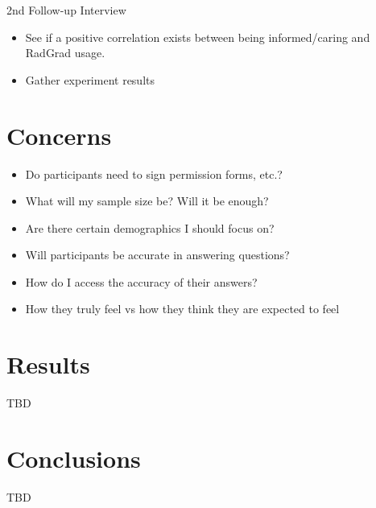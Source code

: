 \documentclass[english]{proposalnsf}
\begin{document}
  2nd Follow-up Interview
  \begin{itemize}
    \item See if a positive correlation exists between being informed/caring and RadGrad usage.
    \item Gather experiment results
  \end{itemize}

  \section{Concerns}
  \label{questions-concerns}

  \begin{itemize}
    \item Do participants need to sign permission forms, etc.?
    \item What will my sample size be? Will it be enough?
    \item Are there certain demographics I should focus on?
    \item Will participants be accurate  in answering questions?
    \item How do I access the accuracy of their answers?
    \item How they truly feel vs how they think they are expected to feel
  \end{itemize}

  \section{Results}
  \label{results}

  TBD

  \section{Conclusions}
  \label{conclusions}

  TBD

  
  

  \appendix
\end{document}
